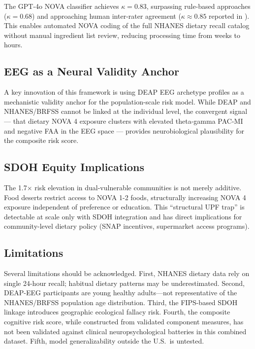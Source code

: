 \documentclass[journal]{IEEEtran}
\begin{document}
The GPT-4o NOVA classifier achieves $\kappa = 0.83$, surpassing rule-based
approaches ($\kappa = 0.68$) and approaching human inter-rater agreement
($\kappa \approx 0.85$ reported in \cite{monteiro2019}). This enables automated
NOVA coding of the full NHANES dietary recall catalog without manual ingredient
list review, reducing processing time from weeks to hours.

\subsection{EEG as a Neural Validity Anchor}

A key innovation of this framework is using DEAP EEG archetype profiles as a
mechanistic validity anchor for the population-scale risk model. While DEAP and
NHANES/BRFSS cannot be linked at the individual level, the convergent signal —
that dietary NOVA 4 exposure clusters with elevated theta-gamma PAC-MI and
negative FAA in the EEG space — provides neurobiological plausibility for the
composite risk score.

\subsection{SDOH Equity Implications}

The 1.7$\times$ risk elevation in dual-vulnerable communities is not merely
additive. Food deserts restrict access to NOVA 1-2 foods, structurally
increasing NOVA 4 exposure independent of preference or education. This
``structural UPF trap'' is detectable at scale only with SDOH integration and
has direct implications for community-level dietary policy (SNAP incentives,
supermarket access programs).

\subsection{Limitations}

Several limitations should be acknowledged. First, NHANES dietary data rely on
single 24-hour recall; habitual dietary patterns may be underestimated.
Second, DEAP-EEG participants are young healthy adults—not representative of the
NHANES/BRFSS population age distribution. Third, the FIPS-based SDOH linkage
introduces geographic ecological fallacy risk. Fourth, the composite cognitive
risk score, while constructed from validated component measures, has not been
validated against clinical neuropsychological batteries in this combined dataset.
Fifth, model generalizability outside the U.S.\ is untested.
\end{document}
